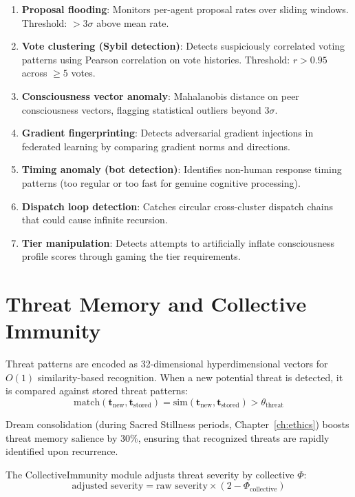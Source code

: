 \documentclass[12pt]{book}
\begin{document}
\begin{enumerate}
  \item \textbf{Proposal flooding}: Monitors per-agent proposal rates over sliding windows. Threshold: $> 3\sigma$ above mean rate.
  \item \textbf{Vote clustering (Sybil detection)}: Detects suspiciously correlated voting patterns using Pearson correlation on vote histories. Threshold: $r > 0.95$ across $\geq 5$ votes.
  \item \textbf{Consciousness vector anomaly}: Mahalanobis distance on peer consciousness vectors, flagging statistical outliers beyond $3\sigma$.
  \item \textbf{Gradient fingerprinting}: Detects adversarial gradient injections in federated learning by comparing gradient norms and directions.
  \item \textbf{Timing anomaly (bot detection)}: Identifies non-human response timing patterns (too regular or too fast for genuine cognitive processing).
  \item \textbf{Dispatch loop detection}: Catches circular cross-cluster dispatch chains that could cause infinite recursion.
  \item \textbf{Tier manipulation}: Detects attempts to artificially inflate consciousness profile scores through gaming the tier requirements.
\end{enumerate}

\section{Threat Memory and Collective Immunity}

Threat patterns are encoded as 32-dimensional hyperdimensional vectors for $O(1)$ similarity-based recognition. When a new potential threat is detected, it is compared against stored threat patterns:
\begin{equation}
\text{match}(\mathbf{t}_{\text{new}}, \mathbf{t}_{\text{stored}}) = \text{sim}(\mathbf{t}_{\text{new}}, \mathbf{t}_{\text{stored}}) > \theta_{\text{threat}}
\end{equation}

Dream consolidation (during Sacred Stillness periods, Chapter~\ref{ch:ethics}) boosts threat memory salience by 30\%, ensuring that recognized threats are rapidly identified upon recurrence.

The CollectiveImmunity module adjusts threat severity by collective $\Phi$:
\begin{equation}
\text{adjusted severity} = \text{raw severity} \times (2 - \Phi_{\text{collective}})
\end{equation}
\end{document}
